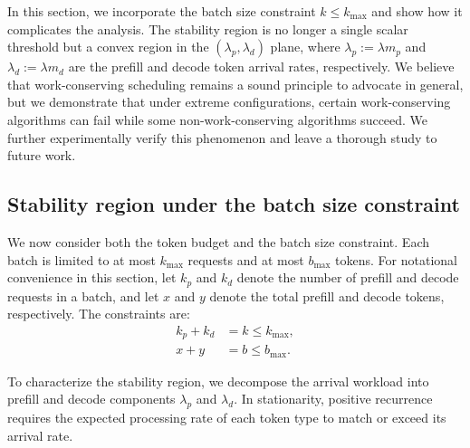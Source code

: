 \documentclass[11pt]{article}
\theoremstyle{plain}
\theoremstyle{definition}
\theoremstyle{remark}
\begin{document}
In this section, we incorporate the batch size constraint $k \le k_{\max}$ and show how it complicates the analysis. The stability region is no longer a single scalar threshold but a convex region in the $(\lambda_p, \lambda_d)$ plane, where $\lambda_p := \lambda m_p$ and $\lambda_d := \lambda m_d$ are the prefill and decode token arrival rates, respectively. We believe that work-conserving scheduling remains a sound principle to advocate in general, but we demonstrate that under extreme configurations, certain work-conserving algorithms can fail while some non-work-conserving algorithms succeed. We further experimentally verify this phenomenon and leave a thorough study to future work.

\subsection{Stability region under the batch size constraint}

We now consider both the token budget and the batch size constraint. Each batch is limited to at most $k_{\max}$ requests and at most $b_{\max}$ tokens. For notational convenience in this section, let $k_p$ and $k_d$ denote the number of prefill and decode requests in a batch, and let $x$ and $y$ denote the total prefill and decode tokens, respectively. The constraints are:
\begin{align}
    k_p + k_d &= k \leq k_{\max}, \label{eq:memory_constraint} \\
    x + y &= b \leq b_{\max}. \label{eq:batch_constraint}
\end{align}

To characterize the stability region, we decompose the arrival workload into prefill and decode components $\lambda_p$ and $\lambda_d$. In stationarity, positive recurrence requires the expected processing rate of each token type to match or exceed its arrival rate.
\end{document}
